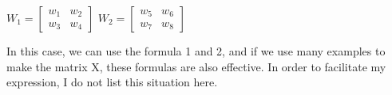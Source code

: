 \documentclass[10pt]{article}
\begin{document}
\begin{flushleft}
        \begin{center}
        $W_1 = \begin{bmatrix}
            w_1  & w_2\\
            w_3  & w_4
        \end{bmatrix}$ \quad
        $W_2 = \begin{bmatrix}
            w_5 & w_6\\
            w_7 & w_8
        \end{bmatrix}$ \vspace{3ex}
        \end{center}
        In this case, we can use the formula 1 and 2, and if we use many examples to make the matrix X, these formulas are also effective. In order to facilitate my expression, I do not list this situation here.
     \end{flushleft} 
\end{document}
